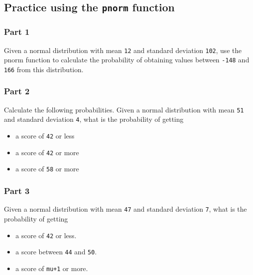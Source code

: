\documentclass[12pt,]{krantz}
\providecommand{\tightlist}{%
  \setlength{\itemsep}{0pt}\setlength{\parskip}{0pt}}
\begin{document}
\hypertarget{sec:Foundationsexercisespnorm}{%
\subsection{\texorpdfstring{Practice using the \texttt{pnorm} function}{Practice using the pnorm function}}\label{sec:Foundationsexercisespnorm}}

\hypertarget{sec:FoundationsexercisespnormPart1}{%
\subsubsection{Part 1}\label{sec:FoundationsexercisespnormPart1}}

Given a normal distribution with mean \texttt{12} and standard deviation \texttt{102}, use the pnorm function to calculate the probability of obtaining values between \texttt{-148} and \texttt{166} from this distribution.

\hypertarget{sec:FoundationsexercisespnormPart2}{%
\subsubsection{Part 2}\label{sec:FoundationsexercisespnormPart2}}

Calculate the following probabilities.
Given a normal distribution with mean \texttt{51} and standard deviation \texttt{4}, what is the probability of getting

\begin{itemize}
\tightlist
\item
  a score of \texttt{42} or less
\item
  a score of \texttt{42} or more
\item
  a score of \texttt{58} or more
\end{itemize}

\hypertarget{sec:FoundationsexercisespnormPart3}{%
\subsubsection{Part 3}\label{sec:FoundationsexercisespnormPart3}}

Given a normal distribution with mean \texttt{47} and standard deviation \texttt{7}, what is the probability of getting

\begin{itemize}
\tightlist
\item
  a score of \texttt{42} or less.
\item
  a score between \texttt{44} and \texttt{50}.
\item
  a score of \texttt{mu+1} or more.
\end{itemize}
\end{document}
